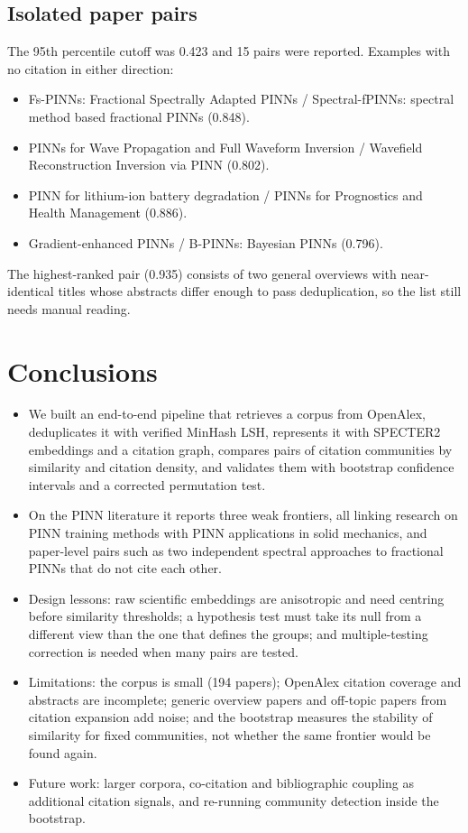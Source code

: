 \documentclass[11pt,a4paper]{article}
\begin{document}
\subsection{Isolated paper pairs}

The 95th percentile cutoff was 0.423 and 15 pairs were reported. Examples with no citation in either direction:
\begin{itemize}
  \item Fs-PINNs: Fractional Spectrally Adapted PINNs / Spectral-fPINNs: spectral method based fractional PINNs (0.848).
  \item PINNs for Wave Propagation and Full Waveform Inversion / Wavefield Reconstruction Inversion via PINN (0.802).
  \item PINN for lithium-ion battery degradation / PINNs for Prognostics and Health Management (0.886).
  \item Gradient-enhanced PINNs / B-PINNs: Bayesian PINNs (0.796).
\end{itemize}
The highest-ranked pair (0.935) consists of two general overviews with near-identical titles whose abstracts differ enough to pass deduplication, so the list still needs manual reading.

\section{Conclusions}

\begin{itemize}
  \item We built an end-to-end pipeline that retrieves a corpus from OpenAlex, deduplicates it with verified MinHash LSH, represents it with SPECTER2 embeddings and a citation graph, compares pairs of citation communities by similarity and citation density, and validates them with bootstrap confidence intervals and a corrected permutation test.
  \item On the PINN literature it reports three weak frontiers, all linking research on PINN training methods with PINN applications in solid mechanics, and paper-level pairs such as two independent spectral approaches to fractional PINNs that do not cite each other.
  \item Design lessons: raw scientific embeddings are anisotropic and need centring before similarity thresholds; a hypothesis test must take its null from a different view than the one that defines the groups; and multiple-testing correction is needed when many pairs are tested.
  \item Limitations: the corpus is small (194 papers); OpenAlex citation coverage and abstracts are incomplete; generic overview papers and off-topic papers from citation expansion add noise; and the bootstrap measures the stability of similarity for fixed communities, not whether the same frontier would be found again.
  \item Future work: larger corpora, co-citation and bibliographic coupling as additional citation signals, and re-running community detection inside the bootstrap.
\end{itemize}
\end{document}
